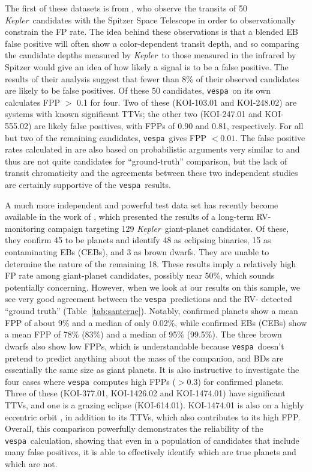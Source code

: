 \documentclass{emulateapj}
\newcommand{\Tab}[1]{Table~\ref{tab:#1}}
\newcommand{\kepler}{\textit{Kepler}}
\newcommand{\vespa}{\texttt{vespa}}
\begin{document}
The first of these datasets is from \citet{Desert:2015}, who observe
the transits of 50 \kepler\ candidates with the Spitzer Space
Telescope in order to observationally constrain the FP rate.  The idea
behind these observations is that a blended EB false positive will
often show a color-dependent transit depth, and so comparing the
candidate depths measured by \kepler\ to those measured in the
infrared by Spitzer would give an idea of how likely a signal is to be
a false positive. The results of their analysis suggest that fewer
than 8\% of their observed candidates are likely to be false
positives.  Of these 50 candidates, \vespa\ on its own calculates FPP
$>$ 0.1 for four.  Two of these (KOI-103.01 and KOI-248.02) are
systems with known significant TTVs; the other two (KOI-247.01 and
KOI-555.02) are likely false positives, with FPPs of 0.90 and 0.81,
respectively.  For all but two of the remaining candidates, \vespa\
gives FPP $< 0.01$.  The false positive rates calculated in
\citet{Desert:2015} are also based on probabilistic arguments very
similar to \citet{Morton:2011b} and thus are not quite candidates for
``ground-truth'' comparison, but the lack of transit chromaticity and
the agreements between these two independent studies are certainly
supportive of the \vespa\ results.

A much more independent and powerful test data set has recently become
available in the work of \citet{Santerne:2015}, which presented the
results of a long-term RV-monitoring campaign targeting 129 \kepler\
giant-planet candidates.  Of these, they confirm 45 to be planets and
identify 48 as eclipsing binaries, 15 as contaminating EBs (CEBs), and
3 as brown dwarfs.  They are unable to determine the nature of the
remaining 18.  These results imply a relatively high FP rate among
giant-planet candidates, possibly near 50\%, which sounds potentially
concerning.  However, when we look at our results on this sample, we
see very good agreement between the \vespa\ predictions and the RV-
detected ``ground truth'' (\Tab{santerne}).  Notably, confirmed
planets show a mean FPP of about 9\% and a median of only 0.02\%,
while confirmed EBs (CEBs) show a mean FPP of 78\% (83\%) and a median
of 95\% (99.5\%).  The three brown dwarfs also show low FPPs, which is
understandable because \vespa\ doesn't pretend to predict anything
about the mass of the companion, and BDs are essentially the same size
as giant planets.  It is also instructive to investigate the four
cases where \vespa\ computes high FPPs ($>$0.3) for confirmed planets.
Three of these (KOI-377.01, KOI-1426.02 and KOI-1474.01) have
significant TTVs, and one is a grazing eclipse (KOI-614.01).
KOI-1474.01 is also on a highly eccentric orbit \citep{Dawson:2012},
in addition to its TTVs, which also contributes to its high FPP.
Overall, this comparison powerfully demonstrates the reliability of
the \vespa\ calculation, showing that even in a population of
candidates that include many false positives, it is able to
effectively identify which are true planets and which are not.
\end{document}
